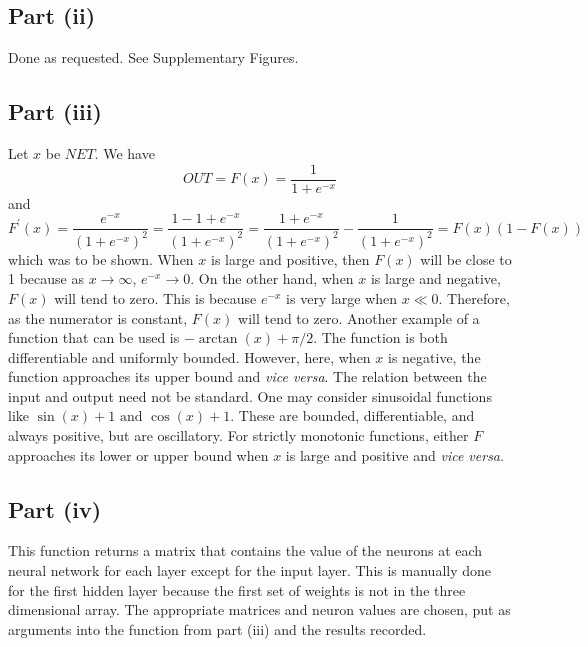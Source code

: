 \documentclass[12pt]{article}
\begin{document}
\subsection*{Part (ii)}
Done as requested.  
See Supplementary Figures.

\subsection*{Part (iii)}
Let $x$ be $NET$.
We have 
\[OUT = F(x) = \frac{1}{1+e^{-x}}\]
and
\[F^\prime(x) = \frac{e^{-x}}{(1+e^{-x})^2} = \frac{1-1+e^{-x}}{(1+e^{-x})^2} = \frac{1+e^{-x}}{(1+e^{-x})^2} -\frac{1}{(1+e^{-x})^2} = F(x)(1-F(x))\]
which was to be shown.
When $x$ is large and positive, then $F(x)$ will be close to 1 because as $x\rightarrow\infty$, $e^{-x}\rightarrow 0$.
On the other hand, when $x$ is large and negative, $F(x)$ will tend to zero.
This is because $e^{-x}$ is very large when $x\ll 0$.
Therefore, as the numerator is constant, $F(x)$ will tend to zero.
Another example of a function that can be used is $-\arctan\left(x\right) + \pi/2$.
The function is both differentiable and uniformly bounded.
However, here, when $x$ is negative, the function approaches its upper bound and \textit{vice versa}.
The relation between the input and output need not be standard.
One may consider sinusoidal functions like $\sin(x)+1 \text{ and }\cos(x)+1$.
These are bounded, differentiable, and always positive, but are oscillatory.
For strictly monotonic functions, either $F$ approaches its lower or upper bound when $x$ is large and positive and \textit{vice versa}.
\subsection*{Part (iv)}
This function returns a matrix that contains the value of the neurons at each neural network for each layer except for the input layer.
This is manually done for the first hidden layer because the first set of weights is not in the three dimensional array.
The appropriate matrices and neuron values are chosen, put as arguments into the function from part (iii) and the results recorded.
\end{document}
